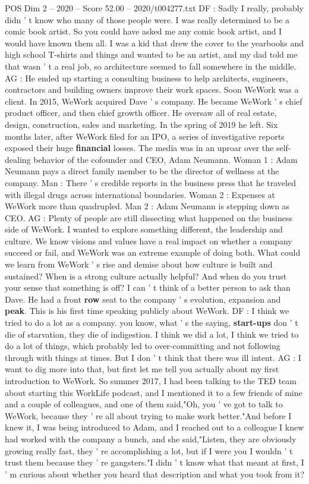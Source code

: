\begin{textsample}{POS Dim 2 – 2020 – Score 52.00 – 2020/t004277.txt}
DF : Sadly I really, probably didn ' t know who many of those people were.
I was really determined to be a comic book artist.
So you could have asked me any comic book artist, and I would have known them all.
I was a kid that drew the cover to the yearbooks and high school T-shirts and things and wanted to be an artist, and my dad told me that wasn ' t a real job, so architecture seemed to fall somewhere in the middle.
AG : He ended up starting a consulting business to help architects, engineers, contractors and building owners improve their work spaces.
Soon WeWork was a client.
In 2015, WeWork acquired Dave ' s company.
He became WeWork ' s chief product officer, and then chief growth officer.
He oversaw all of real estate, design, construction, sales and marketing.
In the spring of 2019 he left.
Six months later, after WeWork filed for an IPO, a series of investigative reports exposed their huge \textbf{financial} losses.
The media was in an uproar over the self-dealing behavior of the cofounder and CEO, Adam Neumann.
Woman 1 : Adam Neumann pays a direct family member to be the director of wellness at the company.
Man : There ' s credible reports in the business press that he traveled with illegal drugs across international boundaries.
Woman 2 : Expenses at WeWork more than quadrupled.
Man 2 : Adam Neumann is stepping down as CEO.
AG : Plenty of people are still dissecting what happened on the business side of WeWork.
I wanted to explore something different, the leadership and culture.
We know visions and values have a real impact on whether a company succeed or fail, and WeWork was an extreme example of doing both.
What could we learn from WeWork ' s rise and demise about how culture is built and sustained?
When is a strong culture actually helpful?
And when do you trust your sense that something is off?
I can ' t think of a better person to ask than Dave.
He had a front \textbf{row} seat to the company ' s evolution, expansion and \textbf{peak}.
This is his first time speaking publicly about WeWork.
DF : I think we tried to do a lot as a company. you know, what ' s the saying, \textbf{start-ups} don ' t die of starvation, they die of indigestion.
I think we did a lot, I think we tried to do a lot of things, which probably led to over-committing and not following through with things at times.
But I don ' t think that there was ill intent.
AG : I want to dig more into that, but first let me tell you actually about my first introduction to WeWork.
So summer 2017, I had been talking to the TED team about starting this WorkLife podcast, and I mentioned it to a few friends of mine and a couple of colleagues, and one of them said,"Oh, you ' ve got to talk to WeWork, because they ' re all about trying to make work better."And before I knew it, I was being introduced to Adam, and I reached out to a colleague I knew had worked with the company a bunch, and she said,"Listen, they are obviously growing really fast, they ' re accomplishing a lot, but if I were you I wouldn ' t trust them because they ' re gangsters."I didn ' t know what that meant at first, I ' m curious about whether you heard that description and what you took from it?

\end{textsample}
